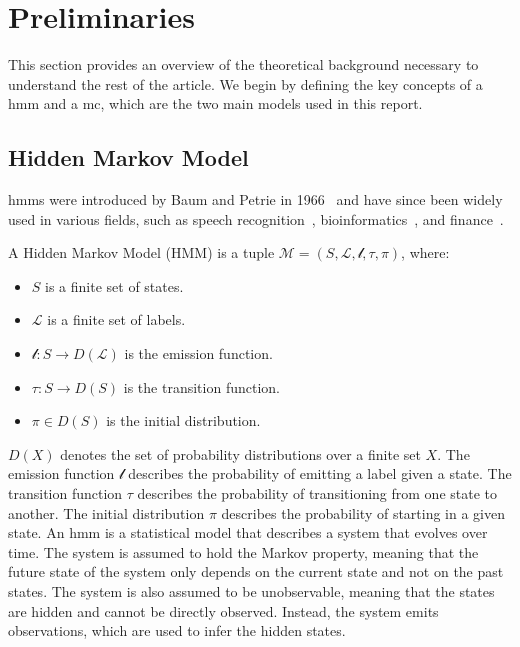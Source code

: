 \section{Preliminaries}\label{sec:preliminaries}
This section provides an overview of the theoretical background necessary to understand the rest of the article.
We begin by defining the key concepts of a \gls{hmm} and a \gls{mc}, which are the two main models used in this report.


\subsection{Hidden Markov Model}\label{subsec:hmm}
\glspl{hmm} were introduced by Baum and Petrie in 1966~\cite{baum1966statistical} and have since been widely used in various fields, such as speech recognition~\cite{chavan2013overview}, bioinformatics~\cite{ciocchetta2009bio}, and finance~\cite{mamon2007hidden}.
\begin{definition}
    A Hidden Markov Model (HMM) is a tuple $\mathcal{M} = (S, \mathcal{L}, \mathscr{l}, \tau,  \pi)$, where:
    \begin{itemize}
        \item $S$ is a finite set of states.
        \item $\mathcal{L}$ is a finite set of labels.
        \item $\mathscr{l}: S \rightarrow D(\mathcal{L})$ is the emission function.
        \item $\tau: S \rightarrow D(S)$ is the transition function.
        \item $\pi \in D(S)$ is the initial distribution.
    \end{itemize}
\end{definition}

$D(X)$ denotes the set of probability distributions over a  finite set $X$.
The emission function $\mathscr{l}$ describes the probability of emitting a label given a state.
The transition function $\tau$ describes the probability of transitioning from one state to another.
The initial distribution $\pi$ describes the probability of starting in a given state.
An \gls{hmm} is a statistical model that describes a system that evolves over time.
The system is assumed to hold the Markov property, meaning that the future state of the system only depends on the current state and not on the past states.
The system is also assumed to be unobservable, meaning that the states are hidden and cannot be directly observed.
Instead, the system emits observations, which are used to infer the hidden states.

